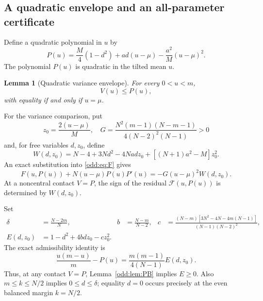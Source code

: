 \documentclass[11pt,a4paper]{article}
\newtheorem{lemma}[theorem]{Lemma}
\begin{document}
\subsection{A quadratic envelope and an all-parameter certificate}
Define a quadratic polynomial in $u$ by
\begin{equation}\label{odd:eq:P}
 P(u)=\frac M4(1-d^2)+ad(u-\mu)-\frac{a^2}{M}(u-\mu)^2.
\end{equation}
The polynomial $P(u)$ is quadratic in the tilted mean $u$.

\begin{lemma}[Quadratic variance envelope]\label{odd:lem:barrier}
For every $0<u<m$,
\begin{equation}\label{odd:eq:barrier}
 \boxed{\quad V(u)\le P(u),\quad}
\end{equation}
with equality if and only if $u=\mu$.
\end{lemma}

For the variance comparison, put
\[
 z_0=\frac{2(u-\mu)}M,\quad
 G=\frac{N^2(m-1)(N-m-1)}{4(N-2)^2(N-1)}>0
\]
and, for free variables $d,z_0$, define
\begin{equation}\label{odd:eq:W}
 W(d,z_0)=N-4+3Nd^2-4Nad z_0+[(N+1)a^2-M]z_0^2.
\end{equation}
An exact substitution into \eqref{odd:eq:F} gives
\begin{equation}\label{odd:eq:residual}
 \boxed{\quad F(u,P(u))+N(u-\mu)P(u)P'(u)
 =-G(u-\mu)^2W(d,z_0).\quad}
\end{equation}
At a noncentral contact $V=P$, the sign of the residual $\mathcal F(u,P(u))$ is determined by $W(d,z_0)$.

Set
\begin{align*}
 \delta&=\frac{N-2m}{N},&
 b&=\frac{N-m}{N-2},&
 c&=\frac{(N-m)[3N^2-4N-4m(N-1)]}{(N-1)(N-2)^2},\\
 E(d,z_0)&=1-d^2+4bdz_0-cz_0^2.
\end{align*}
The exact admissibility identity is
\begin{equation}\label{odd:eq:E}
 \frac{u(m-u)}m-P(u)=\frac{m(m-1)}{4(N-1)}E(d,z_0).
\end{equation}
Thus, at any contact $V=P$, Lemma~\ref{odd:lem:PB} implies $E\ge0$.
Also $m\le k\le N/2$ implies $0\le d\le\delta$; equality $d=0$ occurs precisely at the even balanced margin $k=N/2$.
\end{document}
